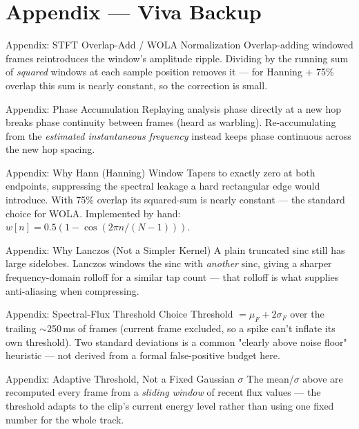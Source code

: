 \documentclass[aspectratio=169]{beamer}
\begin{document}
\appendix
\section*{Appendix --- Viva Backup}
\begin{frame}{Appendix: STFT Overlap-Add / WOLA Normalization}
  Overlap-adding windowed frames reintroduces the window's amplitude ripple.
  Dividing by the running sum of \emph{squared} windows at each sample
  position removes it --- for Hanning + 75\% overlap this sum is nearly
  constant, so the correction is small.
\end{frame}

\begin{frame}{Appendix: Phase Accumulation}
  Replaying analysis phase directly at a new hop breaks phase continuity
  between frames (heard as warbling). Re-accumulating from the
  \emph{estimated instantaneous frequency} instead keeps phase continuous
  across the new hop spacing.
\end{frame}

\begin{frame}{Appendix: Why Hann (Hanning) Window}
  Tapers to exactly zero at both endpoints, suppressing the spectral
  leakage a hard rectangular edge would introduce. With 75\% overlap its
  squared-sum is nearly constant --- the standard choice for WOLA.
  Implemented by hand: $w[n]=0.5(1-\cos(2\pi n/(N-1)))$.
\end{frame}

\begin{frame}{Appendix: Why Lanczos (Not a Simpler Kernel)}
  A plain truncated sinc still has large sidelobes. Lanczos windows the
  sinc with \emph{another} sinc, giving a sharper frequency-domain rolloff
  for a similar tap count --- that rolloff is what supplies anti-aliasing
  when compressing.
\end{frame}

\begin{frame}{Appendix: Spectral-Flux Threshold Choice}
  Threshold $=\mu_F+2\sigma_F$ over the trailing $\sim$250\,ms of frames
  (current frame excluded, so a spike can't inflate its own threshold).
  Two standard deviations is a common "clearly above noise floor"
  heuristic --- not derived from a formal false-positive budget here.
\end{frame}

\begin{frame}{Appendix: Adaptive Threshold, Not a Fixed Gaussian $\sigma$}
  The mean/$\sigma$ above are recomputed every frame from a
  \emph{sliding window} of recent flux values --- the threshold adapts to
  the clip's current energy level rather than using one fixed number for
  the whole track.
\end{frame}
\end{document}

